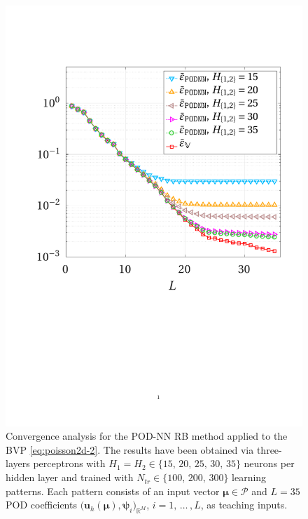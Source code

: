 \documentclass[12pt, a4paper, twoside, openright, notitlepage]{report}
\numberwithin{equation}{chapter}
\theoremstyle{theorem}
\theoremstyle{definition}
\theoremstyle{remark}
\theoremstyle{proposition}
\numberwithin{figure}{chapter}
\newcommand{\bg}[1]{\boldsymbol{#1}}
\begin{document}
\begin{figure}[H]
			\includegraphics[scale = 0.4, trim = {1.5cm 9cm 1.5cm 3.5cm}, clip]{poisson2d_2_nn_convergence}
			
			\vspace*{-0.2cm}
			
			\caption{Convergence analysis for the POD-NN RB method applied to the BVP \eqref{eq:poisson2d-2}. The results have been obtained via three-layers perceptrons with $H_1 = H_2 \in \big\lbrace 15, \, 20, \, 25, \, 30, \, 35 \big\rbrace$ neurons per hidden layer and trained with $N_{tr} \in \big\lbrace 100, \, 200, \, 300 \big\rbrace$ learning patterns. Each pattern consists of an input vector $\bg{\mu} \in \mathcal{P}$ and $L = 35$ POD coefficients $\big( \mathbf{u}_h(\bg{\mu}), \bg{\psi}_i \big)_{\mathbb{R}^M}$, $i = 1, \, \ldots \, , L$, as teaching inputs.}
			\label{fig:poisson2d-2-fig3}
		\end{figure}
				
\end{document}
